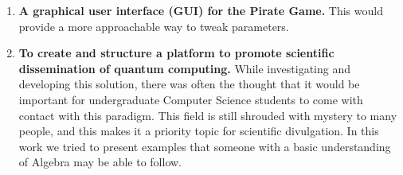 \documentclass{llncs} %
\begin{document}
\begin{enumerate}
\item \textbf{A graphical user interface (GUI) for the Pirate Game.} This would provide a more approachable way to tweak parameters.

\item \textbf{To create and structure a platform to promote scientific dissemination of quantum computing.} While investigating and developing this solution, there was often the thought that it would be important for undergraduate Computer Science students to come with contact with this paradigm. This field is still shrouded with mystery to many people, and this makes it a priority topic for scientific divulgation. In this work we tried to present examples that someone with a basic understanding of Algebra may be able to follow.
\end{enumerate}

 
 






%

%

\end{document}
